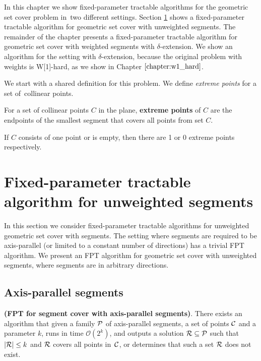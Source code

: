 In this chapter we show fixed-parameter tractable algorithms
for the geometric set cover problem in~two different settings.
Section \ref{section:fpt_unweighted} shows 
a fixed-parameter tractable algorithm for geometric set cover with unweighted segments.
The remainder of the chapter presents
a fixed-parameter tractable algorithm for geometric set cover with weighted segments
with $\delta$-extension.
We show an algorithm for the setting with $\delta$-extension,
because the original problem with weights is W[1]-hard,
as we show in Chapter $\ref{chapter:w1_hard}$.

We start with a shared definition for this problem.
We define \textit{extreme points} for a set of~collinear points.

\begin{defi}
	For a set of collinear points $C$ in the plane,
	\textbf{extreme points} of $C$ are the endpoints
	of the smallest segment that covers all points from set $C$.
	
	If $C$ consists of one point or is empty, then
	there are 1 or 0 extreme points respectively.
\end{defi}

\section{Fixed-parameter tractable algorithm for unweighted segments}
\label{section:fpt_unweighted}
In this section we consider fixed-parameter tractable
algorithms for unweighted geometric set cover with segments.
The setting where segments are required to be axis-parallel
(or limited to a constant number of directions) has a trivial FPT algorithm.
We present an FPT algorithm for geometric set cover
with unweighted segments, where segments are in arbitrary directions.

\subsection{Axis-parallel segments}
\begin{tw}
	\textbf{(FPT for segment cover with axis-parallel segments)}.
	There exists an algorithm that given a family $\mathcal{P}$ of
	axis-parallel segments,
	a set of points $\mathcal{C}$
	and a parameter $k$,
	runs in time $\mathcal{O}(2^k)$,
	and outputs a solution $\mathcal{R} \subseteq \mathcal{P}$
	such that $|\mathcal{R}| \le k$ and $\mathcal{R}$ covers all points in~$\mathcal{C}$,
	or determines that such a set $\mathcal{R}$ does not exist.
\end{tw}

